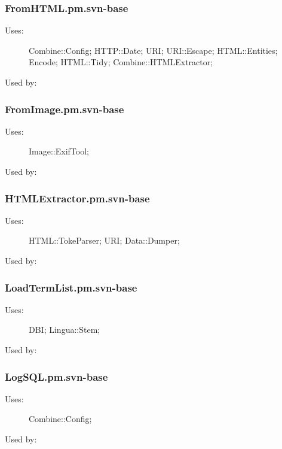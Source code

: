 \subsubsection{FromHTML.pm.svn-base}
\begin{description}
\item[Uses:] Combine::Config; HTTP::Date; URI; URI::Escape; HTML::Entities; Encode; HTML::Tidy; Combine::HTMLExtractor; 

\item[Used by:] 

\end{description}
\subsubsection{FromImage.pm.svn-base}
\begin{description}
\item[Uses:] Image::ExifTool; 

\item[Used by:] 

\end{description}
\subsubsection{HTMLExtractor.pm.svn-base}
\begin{description}
\item[Uses:] HTML::TokeParser; URI; Data::Dumper; 

\item[Used by:] 

\end{description}
\subsubsection{LoadTermList.pm.svn-base}
\begin{description}
\item[Uses:] DBI; Lingua::Stem; 

\item[Used by:] 

\end{description}
\subsubsection{LogSQL.pm.svn-base}
\begin{description}
\item[Uses:] Combine::Config; 

\item[Used by:] 

\end{description}
